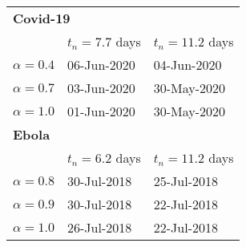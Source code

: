 \begin{tabular}{lll} 
\hline
\multicolumn{3}{l}{ \bf Covid-19} \\ 
 &  $t_n=7.7$ days & $t_n=11.2$ days \\ 
$\alpha=0.4$ & 06-Jun-2020 & 04-Jun-2020 \\ 
 $\alpha=0.7$ & 03-Jun-2020 & 30-May-2020 \\ 
 $\alpha=1.0$ & 01-Jun-2020 & 30-May-2020 \\ 
 \hline
\multicolumn{3}{l}{ \bf Ebola} \\ 
 &  $t_n=6.2$ days & $t_n=11.2$ days \\ 
$\alpha=0.8$ & 30-Jul-2018 & 25-Jul-2018 \\ 
 $\alpha=0.9$ & 30-Jul-2018 & 22-Jul-2018 \\ 
 $\alpha=1.0$ & 26-Jul-2018 & 22-Jul-2018 \\ 
 \hline
\end{tabular} 
